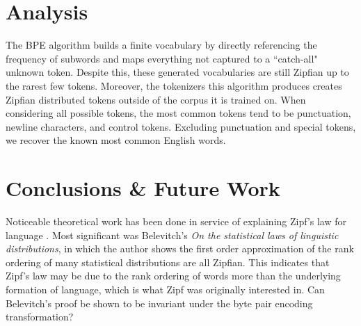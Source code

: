 \documentclass[11pt]{article}
\begin{document}


\section{Analysis}

The BPE algorithm builds a finite vocabulary by directly referencing the frequency of subwords and maps everything not captured to a ``catch-all" unknown token. Despite this, these generated vocabularies are still Zipfian up to the rarest few tokens. Moreover, the tokenizers this algorithm produces creates Zipfian distributed tokens outside of the corpus it is trained on. When considering all possible tokens, the most common tokens tend to be punctuation, newline characters, and control tokens. Excluding punctuation and special tokens, we recover the known most common English words. 

\section{Conclusions \& Future Work}

Noticeable theoretical work has been done in service of explaining Zipf's law for language \cite{li1992}. Most significant was Belevitch's \textit{On the statistical laws of linguistic distributions}\cite{Belevitch1959}, in which the author shows the first order approximation of the rank ordering of many statistical distributions are all Zipfian. This indicates that Zipf's law may be due to the rank ordering of words more than the underlying formation of language, which is what Zipf was originally interested in. Can Belevitch's proof be shown to be invariant under the byte pair encoding transformation?

%




\end{document}
